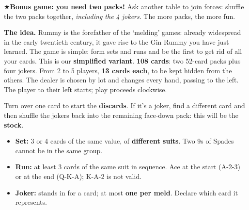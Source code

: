 \documentclass[10pt]{article}
\begin{document}
\startpage\label{ramino}
\begin{callout}
{\suitfont\color{golddk}★}\quad\textbf{Bonus game: you need two packs!} Ask another table to join forces: shuffle the two packs together, \emph{including the 4 jokers}. The more packs, the more fun.
\end{callout}
\textbf{The idea.} Rummy is the forefather of the ‘melding’ games: already widespread in the early twentieth century, it gave rise to the Gin Rummy you have just learned. The game is simple: form sets and runs and be the first to get rid of all your cards. This is our \textbf{simplified variant}.
\textbf{108 cards}: two 52-card packs plus four jokers. From 2 to 5 players, \textbf{13 cards each}, to be kept hidden from the others. The dealer is chosen by lot and changes every hand, passing to the left. The player to their left starts; play proceeds clockwise.

Turn over one card to start the \textbf{discards}. If it’s a joker, find a different card and then shuffle the jokers back into the remaining face-down pack: this will be the \textbf{stock}.
\begin{itemize}
 \item \textbf{Set:} 3 or 4 cards of the same value, of \textbf{different suits}. Two 9s of Spades cannot be in the same group.
 \item \textbf{Run:} at least 3 cards of the same suit in sequence. Ace at the start (A-2-3) or at the end (Q-K-A); K-A-2 is not valid.
 \item \textbf{Joker:} stands in for a card; at most \textbf{one per meld}. Declare which card it represents.
\end{itemize}
\begin{center}
\hfill
{}
\end{center}
\end{document}
